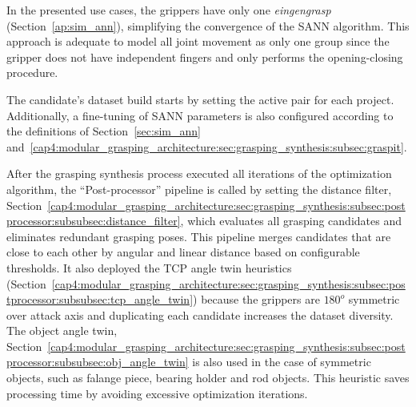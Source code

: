 In the presented use cases, the grippers have only one \textit{eingengrasp} (Section~\ref{ap:sim_ann}), simplifying the convergence of the \ac{SANN} algorithm. This approach is adequate to model all joint movement as only one group since the gripper does not have independent fingers and only performs the opening-closing procedure.


The candidate's dataset build starts by setting the active pair for each project. Additionally, a fine-tuning of \ac{SANN} parameters is also configured according to the definitions of Section~\ref{sec:sim_ann} and~\ref{cap4:modular_grasping_architecture:sec:grasping_synthesis:subsec:graspit}. 




After the grasping synthesis process executed all iterations of the optimization algorithm, the ``Post-processor'' pipeline is called by setting the distance filter, Section~\ref{cap4:modular_grasping_architecture:sec:grasping_synthesis:subsec:postprocessor:subsubsec:distance_filter}, which evaluates all grasping candidates and eliminates redundant grasping poses. This pipeline merges candidates that are close to each other by angular and linear distance based on configurable thresholds. It also deployed the \ac{TCP} angle twin heuristics (Section~\ref{cap4:modular_grasping_architecture:sec:grasping_synthesis:subsec:postprocessor:subsubsec:tcp_angle_twin}) because the grippers are $180^o$ symmetric over attack axis and duplicating each candidate increases the dataset diversity. The object angle twin, Section~\ref{cap4:modular_grasping_architecture:sec:grasping_synthesis:subsec:postprocessor:subsubsec:obj_angle_twin} is also used in the case of symmetric objects, such as falange piece, bearing holder and rod objects. This heuristic saves processing time by avoiding excessive optimization iterations.

